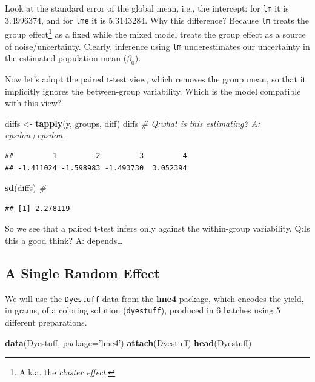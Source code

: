 \documentclass[]{book}
\newenvironment{Shaded}{\begin{snugshade}}{\end{snugshade}}
\newcommand{\KeywordTok}[1]{\textcolor[rgb]{0.13,0.29,0.53}{\textbf{#1}}}
\newcommand{\DataTypeTok}[1]{\textcolor[rgb]{0.13,0.29,0.53}{#1}}
\newcommand{\StringTok}[1]{\textcolor[rgb]{0.31,0.60,0.02}{#1}}
\newcommand{\CommentTok}[1]{\textcolor[rgb]{0.56,0.35,0.01}{\textit{#1}}}
\newcommand{\NormalTok}[1]{#1}
\theoremstyle{definition}
\theoremstyle{definition}
\theoremstyle{definition}
\theoremstyle{remark}
\begin{document}
Look at the standard error of the global mean, i.e., the intercept: for
\texttt{lm} it is 3.4996374, and for \texttt{lme} it is 5.3143284. Why
this difference? Because \texttt{lm} treats the group effect\footnote{A.k.a.
  the \emph{cluster effect}.} as a fixed while the mixed model treats
the group effect as a source of noise/uncertainty. Clearly, inference
using \texttt{lm} underestimates our uncertainty in the estimated
population mean (\(\beta_0\)).

Now let's adopt the paired t-test view, which removes the group mean, so
that it implicitly ignores the between-group variability. Which is the
model compatible with this view?

\begin{Shaded}
\begin{Highlighting}[]
\NormalTok{diffs <-}\StringTok{ }\KeywordTok{tapply}\NormalTok{(y, groups, diff) }
\NormalTok{diffs }\CommentTok{# Q:what is this estimating? A: epsilon+epsilon.}
\end{Highlighting}
\end{Shaded}

\begin{verbatim}
##         1         2         3         4 
## -1.411024 -1.598983 -1.493730  3.052394
\end{verbatim}

\begin{Shaded}
\begin{Highlighting}[]
\KeywordTok{sd}\NormalTok{(diffs) }\CommentTok{# }
\end{Highlighting}
\end{Shaded}

\begin{verbatim}
## [1] 2.278119
\end{verbatim}

So we see that a paired t-test infers only against the within-group
variability. Q:Is this a good think? A: depends\ldots{}

\subsection{A Single Random Effect}\label{a-single-random-effect}

We will use the \texttt{Dyestuff} data from the \textbf{lme4} package,
which encodes the yield, in grams, of a coloring solution
(\texttt{dyestuff}), produced in 6 batches using 5 different
preparations.

\begin{Shaded}
\begin{Highlighting}[]
\KeywordTok{data}\NormalTok{(Dyestuff, }\DataTypeTok{package=}\StringTok{'lme4'}\NormalTok{)}
\KeywordTok{attach}\NormalTok{(Dyestuff)}
\KeywordTok{head}\NormalTok{(Dyestuff)}
\end{Highlighting}
\end{Shaded}
\end{document}
